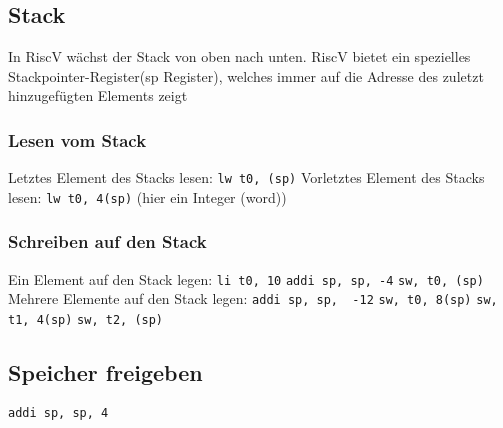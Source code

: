 	\subsection{Stack}
		In RiscV wächst der Stack von oben nach unten. RiscV bietet ein spezielles Stackpointer-Register(sp Register), welches immer auf die Adresse des zuletzt hinzugefügten Elements zeigt
		\subsubsection{Lesen vom Stack}
			Letztes Element des Stacks lesen: \verb|lw t0, (sp)| \newline
			Vorletztes Element des Stacks lesen: \verb|lw t0, 4(sp)| (hier ein Integer (word))
		\subsubsection{Schreiben auf den Stack}
			Ein Element auf den Stack legen: \newline
			\verb|li t0, 10|\newline
			\verb|addi sp, sp, -4|\newline
			\verb|sw, t0, (sp)|
			\newline \newline
			Mehrere Elemente auf den Stack legen: \newline
			\verb|addi sp, sp,  -12|\newline
			\verb|sw, t0, 8(sp)|\newline
			\verb|sw, t1, 4(sp)|\newline
			\verb|sw, t2, (sp)|
		\subsection{Speicher freigeben}
			\verb|addi sp, sp, 4|